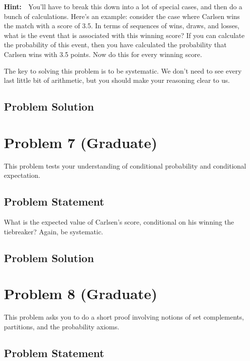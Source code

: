 \documentclass[12pt]{article}
\theoremstyle{definition}
\begin{document}
\bigskip
\noindent
{\bf Hint:}\ \ You'll have to break this down into a lot of special cases, and then do a bunch of calculations. Here's an example: consider the case where Carlsen wins the match with a score of 3.5. In terms of sequences of wins, draws, and losses, what is the event that is associated with this winning score? If you can calculate the probability of this event, then you have calculated the probability that Carlsen wins with 3.5 points. Now do this for every winning score.

\bigskip
The key to solving this problem is to be systematic. We don't need to see every last little bit of arithmetic, but you should make your reasoning clear to us.


\subsection*{Problem Solution}





\newpage
\section*{Problem 7 (Graduate)}

This problem tests your understanding of conditional probability and conditional expectation.

\subsection*{Problem Statement}

What is the expected value of Carlsen's score, conditional on his winning the tiebreaker? Again, be systematic.

\subsection*{Problem Solution}





\newpage
\section*{Problem 8 (Graduate)}

This problem asks you to do a short proof involving notions of set complements, partitions, and the probability axioms.

\subsection*{Problem Statement}
\end{document}
